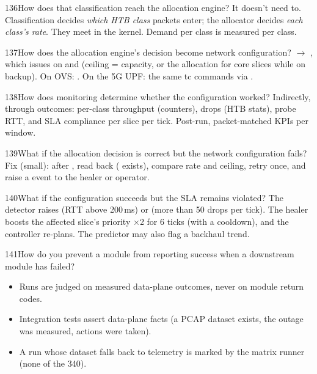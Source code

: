 \begin{qa}{136}{How does that classification reach the allocation engine?}
It doesn't need to. Classification decides \emph{which HTB class} packets enter; the allocator decides \emph{each
class's rate}. They meet in the kernel. Demand per class is measured per class.
\end{qa}

\begin{qa}{137}{How does the allocation engine's decision become network configuration?}
 $\rightarrow$ , which issues
 on  and  (ceiling = capacity, or the
allocation for core slices while on backup). On OVS: . On the 5G UPF: the same tc commands
via .
\end{qa}

\begin{qa}{138}{How does monitoring determine whether the configuration worked?}
Indirectly, through outcomes: per-class throughput (counters), drops (HTB stats), probe RTT, and SLA compliance per
slice per tick. Post-run, packet-matched KPIs per window.
\end{qa}

\begin{qa}{139}{What if the allocation decision is correct but the network configuration fails?}
Fix (small): after , read back  ( exists),
compare rate and ceiling, retry once, and raise a  event to the healer or operator.
\end{qa}

\begin{qa}{140}{What if the configuration succeeds but the SLA remains violated?}
The detector raises  (RTT above 200\,ms) or  (more than 50 drops per tick). The
healer boosts the affected slice's priority $\times$2 for 6 ticks (with a cooldown), and the controller re-plans.
The predictor may also flag a backhaul trend.
\end{qa}

\begin{qa}{141}{How do you prevent a module from reporting success when a downstream module has failed?}
\begin{itemize}
\item Runs are judged on measured data-plane outcomes, never on module return codes.
\item Integration tests assert data-plane facts (a PCAP dataset exists, the outage was measured, actions were taken).
\item A run whose dataset falls back to telemetry is marked  by the matrix runner (none of the 340).
\end{itemize}
\end{qa}

